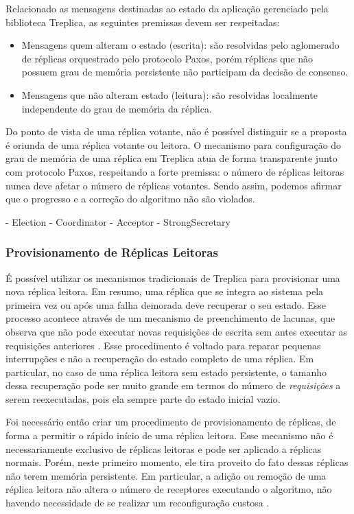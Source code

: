 Relacionado as mensagens destinadas ao estado da aplicação gerenciado pela biblioteca
Treplica, as seguintes premissas devem ser respeitadas:

\begin{itemize}
  \item Mensagens quem alteram o estado (escrita): são resolvidas pelo aglomerado de
    réplicas orquestrado pelo protocolo Paxos, porém réplicas que não possuem grau de
    memória persistente não participam da decisão de consenso.
  \item Mensagens que não alteram estado (leitura): são resolvidas localmente independente
    do grau de memória da réplica.
\end{itemize}

Do ponto de vista de uma réplica votante, não é possível distinguir se a proposta é
oriunda de uma réplica votante ou leitora. O mecanismo para configuração do grau de
memória de uma réplica em Treplica atua de forma transparente junto com protocolo Paxos,
respeitando a forte premissa: o número de réplicas leitoras nunca deve afetar o número de
réplicas votantes. Sendo assim, podemos afirmar que o progresso e a correção do algoritmo
não são violados.

  - Election
  - Coordinator
  - Acceptor
  - StrongSecretary

\subsubsection{Provisionamento de Réplicas Leitoras}

É possível utilizar os mecanismos tradicionais de Treplica para provisionar uma nova
réplica leitora. Em resumo, uma réplica que se integra ao sistema pela primeira vez ou
após uma falha demorada deve recuperar o seu estado. Esse processo acontece através de um
mecanismo de preenchimento de lacunas, que observa que não pode executar novas requisições
de escrita sem antes executar as requisições anteriores \cite{vieira-tr10b}. Esse
procedimento é voltado para reparar pequenas interrupções e não a recuperação do estado
completo de uma réplica. Em particular, no caso de uma réplica leitora sem estado
persistente, o tamanho dessa recuperação pode ser muito grande em termos do número de
\emph{requisições} a serem reexecutadas, pois ela sempre parte do estado inicial vazio.

Foi necessário então criar um procedimento de provisionamento de réplicas, de forma a
permitir o rápido início de uma réplica leitora. Esse mecanismo não é necessariamente
exclusivo de réplicas leitoras e pode ser aplicado a réplicas normais. Porém, neste
primeiro momento, ele tira proveito do fato dessas réplicas não terem memória persistente.
Em particular, a adição ou remoção de uma réplica leitora não altera o número de
receptores executando o algoritmo, não havendo necessidade de se realizar um
reconfiguração custosa \cite{lamport10}.


